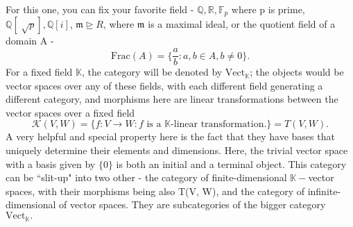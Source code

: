 \documentclass[../category_theory.tex]{subfiles}
\begin{document}
\begin{example}
	For this one, you can fix your favorite field - \(\mathbb{Q},\mathbb{R},\mathbb{F}_{p}\) where p is prime, \(\mathbb{Q}[\sqrt[]{p}], \mathbb{Q}[i]\), \(\mathfrak{m} \trianglerighteq R\), where \(\mathfrak{m}\) is a maximal ideal, or the quotient field of a domain A - \[\mathrm{Frac}(A)=\biggl\{\frac{a}{b}: a, b\in A, b\neq0\biggr\}.\] For a fixed field \(\mathbb{K}\), the category will be denoted by \(\mathrm{Vect}_{\mathbb{K}}\); the objects would be vector spaces over any of these fields, with each different field generating a different category, and morphisms here are linear transformations between the vector spaces over a fixed field
	\[
		\mathcal{K}(V, W)=\{f:V\rightarrow W: f \text{ is a }\mathbb{K}\text{-linear transformation.}\}=T(V, W).
	\]
	A very helpful and special property here is the fact that they have bases that uniquely determine their elements and dimensions. Here, the trivial vector space with a basis given by \(\{0\}\) is both an initial and a terminal object. This category can be ``slit-up" into two other - the category of finite-dimensional \(\mathbb{K}-\)vector spaces, with their morphisms being also T(V, W), and the category of infinite-dimensional of vector spaces.  They are subcategories of the bigger category \(\mathrm{Vect}_{\mathbb{K}}.\)
\end{example}
\end{document}

